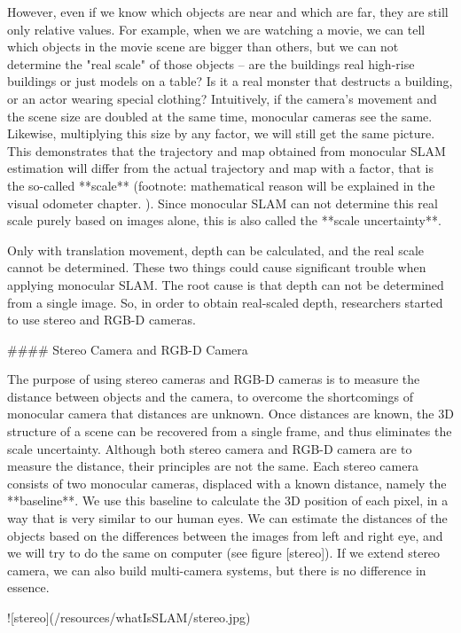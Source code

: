 However, even if we know which objects are near and which are far, they are still only relative values. For example, when we are watching a movie, we can tell which objects in the movie scene are bigger than others, but we can not determine the "real scale" of those objects -- are the buildings real high-rise buildings or just models on a table? Is it a real monster that destructs a building, or an actor wearing special clothing? Intuitively, if the camera's movement and the scene size are doubled at the same time, monocular cameras see the same. Likewise, multiplying this size by any factor, we will still get the same picture. This demonstrates that the trajectory and map obtained from monocular SLAM estimation will differ from the actual trajectory and map with a factor, that is the so-called **scale** (footnote: mathematical reason will be explained in the visual odometer chapter. ). Since monocular SLAM can not determine this real scale purely based on images alone, this is also called the **scale uncertainty**.

Only with translation movement, depth can be calculated, and the real scale cannot be determined. These two things could cause significant trouble when applying monocular SLAM. The root cause is that depth can not be determined from a single image. So, in order to obtain real-scaled depth, researchers started to use stereo and RGB-D cameras.

#### Stereo Camera and RGB-D Camera

The purpose of using stereo cameras and RGB-D cameras is to measure the distance between objects and the camera, to overcome the shortcomings of monocular camera that distances are unknown. Once distances are known, the 3D structure of a scene can be recovered from a single frame, and thus eliminates the scale uncertainty. Although both stereo camera and RGB-D camera are to measure the distance, their principles are not the same. Each stereo camera consists of two monocular cameras, displaced with a known distance, namely the **baseline**. We use this baseline to calculate the 3D position of each pixel, in a way that is very similar to our human eyes. We can estimate the distances of the objects based on the differences between the images from left and right eye, and we will try to do the same on computer (see figure [stereo]). If we extend stereo camera, we can also build multi-camera systems, but there is no difference in essence.

![stereo](/resources/whatIsSLAM/stereo.jpg)


